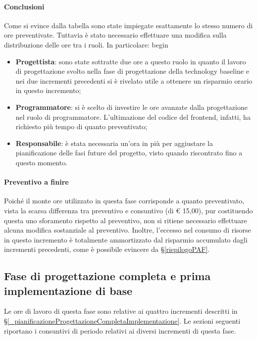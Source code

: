 \paragraph{Conclusioni}
Come si evince dalla tabella sono state impiegate esattamente lo stesso numero di ore preventivate. Tuttavia è stato necessario effettuare una modifica sulla distribuzione delle ore tra i ruoli. In particolare:
begin\begin{itemize}
	\item \textbf{Progettista}: sono state sottratte due ore a questo ruolo in quanto il lavoro di progettazione svolto nella fase di progettazione della technology baseline e nei due incrementi precedenti si è rivelato utile a ottenere un risparmio orario in questo incremento;
	\item \textbf{Programmatore}: si è scelto di investire le ore avanzate dalla progettazione nel ruolo di programmatore. L'ultimazione del codice del frontend, infatti, ha richiesto più tempo di quanto preventivato;
	\item \textbf{Responsabile}: è stata necessaria un'ora in più per aggiustare la pianificazione delle fasi future del progetto, visto quando riscontrato fino a questo momento.
\end{itemize} 

\paragraph{Preventivo a finire}
Poiché il monte ore utilizzato in questa fase corrisponde a quanto preventivato, vista la scarsa differenza tra preventivo e consuntivo (di € 15,00), pur costituendo questa uno sforamento rispetto al preventivo, non si ritiene necessario effettuare alcuna modifica sostanziale al preventivo. Inoltre, l'eccesso nel consumo di risorse in questo incremento è totalmente ammortizzato dal risparmio accumulato dagli incrementi precedenti, come è possibile evincere da \S\ref{riepilogoPAF}.

\subsection{Fase di progettazione completa e prima implementazione di base} \label{_consuntivoPoC}
Le ore di lavoro di questa fase sono relative ai quattro incrementi descritti in \S\ref{_pianificazioneProgettazioneCompletaImplementazione}.
Le sezioni seguenti riportano i consuntivi di periodo relativi ai diversi incrementi di questa fase.



